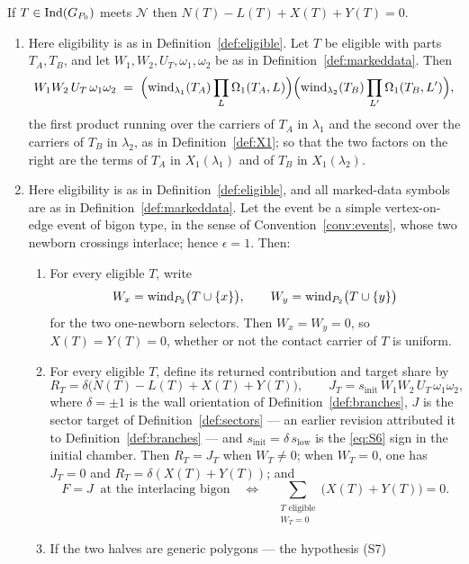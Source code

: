 \begin{theorem}\label{thm:s7universal}
If $T\in\operatorname{Ind}(G_{P_0})$ meets $\mathcal N$ then
$N(T)-L(T)+X(T)+Y(T)=0$.
\begin{enumerate}
\item[(A)] Here eligibility is as in Definition~\ref{def:eligible}.
Let $T$ be eligible with parts $T_A,T_B$, and let $W_1,W_2,U_T,\omega_1,\omega_2$
be as in Definition~\ref{def:markeddata}. Then
\[
   W_1W_2\,U_T\,\omega_1\omega_2
   \;=\;
   \Bigl(\operatorname{wind}_{\lambda_1}(T_A)\prod_{L}\Omega_1(T_A,L)\Bigr)
   \Bigl(\operatorname{wind}_{\lambda_2}(T_B)\prod_{L'}\Omega_1(T_B,L')\Bigr),
\]
the first product running over the carriers of $T_A$ in $\lambda_1$ and the
second over the carriers of $T_B$ in $\lambda_2$, as in
Definition~\ref{def:X1};
so that the two factors on the right are the terms of $T_A$ in
$X_1(\lambda_1)$ and of $T_B$ in $X_1(\lambda_2)$.
\item[(B)] Here eligibility is as in Definition~\ref{def:eligible}, and all
marked-data symbols are as in Definition~\ref{def:markeddata}.
Let the event be a simple vertex-on-edge event of bigon type, in the sense of
Convention~\ref{conv:events}, whose two newborn crossings interlace; hence
$\epsilon=1$. Then:
\begin{enumerate}
\item[(i)] For every eligible $T$, write
\[
   W_x=\operatorname{wind}_{P_2}\bigl(T\cup\{x\}\bigr),\qquad
   W_y=\operatorname{wind}_{P_2}\bigl(T\cup\{y\}\bigr)
\]
for the two one-newborn selectors. Then $W_x=W_y=0$, so
$X(T)=Y(T)=0$, whether or not the contact carrier of $T$ is uniform.
\item[(ii)] For every eligible $T$, define its returned contribution and
target share by
\[
   R_T=\delta\bigl(N(T)-L(T)+X(T)+Y(T)\bigr),\qquad
   J_T=s_{\mathrm{init}}\,W_1W_2\,U_T\,\omega_1\omega_2,
\]
where $\delta=\pm1$ is the wall orientation of Definition~\ref{def:branches},
$J$ is the sector target of Definition~\ref{def:sectors} --- an earlier revision
attributed it to Definition~\ref{def:branches} --- and
$s_{\mathrm{init}}=\delta\,s_{\mathrm{low}}$ is the \eqref{eq:S6} sign in the
initial chamber. Then $R_T=J_T$ when $W_T\neq0$; when
$W_T=0$, one has $J_T=0$ and $R_T=\delta(X(T)+Y(T))$; and
\[
   F=J\ \text{ at the interlacing bigon}
   \quad\Longleftrightarrow\quad
   \sum_{\substack{T\text{ eligible}\\ W_T=0}}
   \bigl(X(T)+Y(T)\bigr)=0 .
\]
\item[(iii)] If the two halves are generic polygons --- the hypothesis (S7)

\end{enumerate}
\end{enumerate}
\end{theorem}

